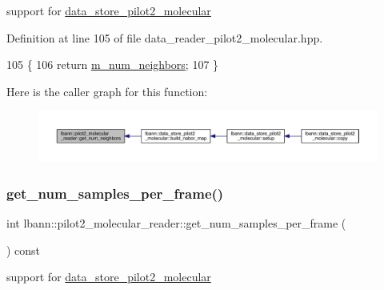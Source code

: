 support for \hyperlink{classlbann_1_1data__store__pilot2__molecular}{data\+\_\+store\+\_\+pilot2\+\_\+molecular} 



Definition at line 105 of file data\+\_\+reader\+\_\+pilot2\+\_\+molecular.\+hpp.


\begin{DoxyCode}
105                                 \{
106     \textcolor{keywordflow}{return} \hyperlink{classlbann_1_1pilot2__molecular__reader_aaf41323e4da85467de398b4ab4b58c2c}{m\_num\_neighbors};
107   \}
\end{DoxyCode}
Here is the caller graph for this function\+:\nopagebreak
\begin{figure}[H]
\begin{center}
\leavevmode
\includegraphics[width=350pt]{classlbann_1_1pilot2__molecular__reader_a7c379056841cda42247ff518270bcfdf_icgraph}
\end{center}
\end{figure}
\mbox{\label{classlbann_1_1pilot2__molecular__reader_a91e233f9878e93e31de2085cbcad1f10}} 
\subsubsection{\texorpdfstring{get\+\_\+num\+\_\+samples\+\_\+per\+\_\+frame()}{get\_num\_samples\_per\_frame()}}
{\footnotesize\ttfamily int lbann\+::pilot2\+\_\+molecular\+\_\+reader\+::get\+\_\+num\+\_\+samples\+\_\+per\+\_\+frame (\begin{DoxyParamCaption}{ }\end{DoxyParamCaption}) const\hspace{0.3cm}{\ttfamily [inline]}}



support for \hyperlink{classlbann_1_1data__store__pilot2__molecular}{data\+\_\+store\+\_\+pilot2\+\_\+molecular} 



